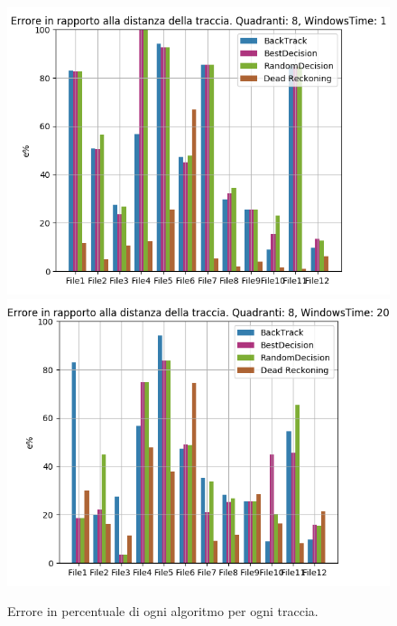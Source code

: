 \documentclass[12pt,a4paper,openright,twoside]{report}
\begin{document}
\begin{figure}[H]
\centering 
\includegraphics[scale=0.4]{firstChart8-1} 
\includegraphics[scale=0.4]{firstChart8-20} 
\caption{Errore in percentuale di ogni algoritmo per ogni traccia.} 

\end{figure}
\end{document}
